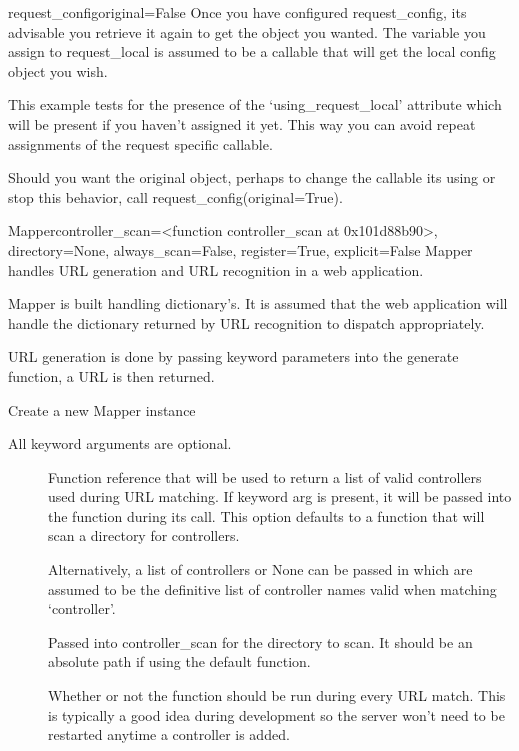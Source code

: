 \documentclass[letterpaper,10pt,english]{manual}
\begin{document}
\begin{funcdesc}{request\_config}{original=False}
Once you have configured request\_config, its advisable you retrieve it 
again to get the object you wanted. The variable you assign to 
request\_local is assumed to be a callable that will get the local config 
object you wish.

This example tests for the presence of the `using\_request\_local' attribute
which will be present if you haven't assigned it yet. This way you can 
avoid repeat assignments of the request specific callable.

Should you want the original object, perhaps to change the callable its 
using or stop this behavior, call request\_config(original=True).
\end{funcdesc}

\hypertarget{routes.Mapper}{}\begin{classdesc}{Mapper}{controller\_scan=\textless{}function controller\_scan at 0x101d88b90\textgreater{}, directory=None, always\_scan=False, register=True, explicit=False}
Mapper handles URL generation and URL recognition in a web
application.

Mapper is built handling dictionary's. It is assumed that the web
application will handle the dictionary returned by URL recognition
to dispatch appropriately.

URL generation is done by passing keyword parameters into the
generate function, a URL is then returned.

Create a new Mapper instance

All keyword arguments are optional.
\begin{description}
\item[]
Function reference that will be used to return a list of
valid controllers used during URL matching. If
 keyword arg is present, it will be passed
into the function during its call. This option defaults to
a function that will scan a directory for controllers.

Alternatively, a list of controllers or None can be passed
in which are assumed to be the definitive list of
controller names valid when matching `controller'.

\item[]
Passed into controller\_scan for the directory to scan. It
should be an absolute path if using the default 
 function.

\item[]
Whether or not the  function should be
run during every URL match. This is typically a good idea
during development so the server won't need to be restarted
anytime a controller is added.


\end{description}
\end{classdesc}
\end{document}
